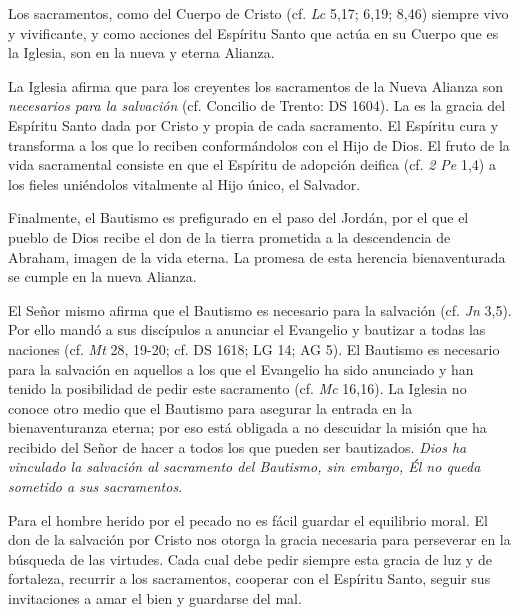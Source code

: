

\begin{ccebody}
 Los sacramentos, como  del Cuerpo de Cristo (cf. \textit{Lc} 5,17; 6,19; 8,46) siempre vivo y vivificante, y como acciones del Espíritu Santo que actúa en su Cuerpo que es la Iglesia, son  en la nueva y eterna Alianza.

 La Iglesia afirma que para los creyentes los sacramentos de la Nueva Alianza son \textit{necesarios para la salvación} (cf. Concilio de Trento: DS 1604). La  es la gracia del Espíritu Santo dada por Cristo y propia de cada sacramento. El Espíritu cura y transforma a los que lo reciben conformándolos con el Hijo de Dios. El fruto de la vida sacramental consiste en que el Espíritu de adopción deifica (cf. \textit{2 Pe} 1,4) a los fieles uniéndolos vitalmente al Hijo único, el Salvador.

 Finalmente, el Bautismo es prefigurado en el paso del Jordán, por el que el pueblo de Dios recibe el don de la tierra prometida a la descendencia de Abraham, imagen de la vida eterna. La promesa de esta herencia bienaventurada se cumple en la nueva Alianza.
\end{ccebody}



\begin{ccebody}

 El Señor mismo afirma que el Bautismo es necesario para la salvación (cf. \textit{Jn} 3,5). Por ello mandó a sus discípulos a anunciar el Evangelio y bautizar a todas las naciones (cf. \textit{Mt} 28, 19-20; cf. DS 1618; LG 14; AG 5). El Bautismo es necesario para la salvación en aquellos a los que el Evangelio ha sido anunciado y han tenido la posibilidad de pedir este sacramento (cf. \textit{Mc} 16,16). La Iglesia no conoce otro medio que el Bautismo para asegurar la entrada en la bienaventuranza eterna; por eso está obligada a no descuidar la misión que ha recibido del Señor de hacer  a todos los que pueden ser bautizados. \textit{Dios ha vinculado la salvación al sacramento del Bautismo, sin embargo, Él no queda sometido a sus sacramentos}.

 Para el hombre herido por el pecado no es fácil guardar el equilibrio moral. El don de la salvación por Cristo nos otorga la gracia necesaria para perseverar en la búsqueda de las virtudes. Cada cual debe pedir siempre esta gracia de luz y de fortaleza, recurrir a los sacramentos, cooperar con el Espíritu Santo, seguir sus invitaciones a amar el bien y guardarse del mal.
\end{ccebody}